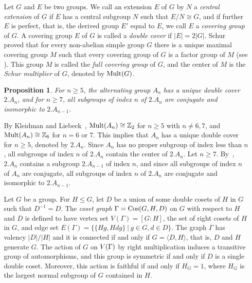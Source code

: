 \documentclass[12pt]{article}
\newtheorem{prop}[lem]{Proposition}%
\def\f{\noindent}
\def\Cos{\hbox{\rm Cos}}
\newcommand{\qed}{\mbox{\raisebox{0.7ex}{\fbox{}}} \vspace{4truemm}}
\def\mz{{\mathbb Z}}
\begin{document}
Let $G$ and $E$ be two groups. We call an extension $E$ of $G$ by $N$ a {\em central extension} of $G$ if $E$ has a central subgroup $N$ such that $E/N\cong G$, and if further $E$ is perfect, that is, the derived group $E'$ equal to $E$, we call $E$ a {\em covering group} of $G$. A covering group $E$ of $G$ is called a {\em double cover} if $|E|=2|G|$. Schur~\cite{Schur} proved that for every non-abelian simple group $G$ there is a unique maximal covering group $M$ such that every covering group of $G$ is a factor group of $M$ (see \cite[Kapitel V, \S23]{Huppert}). This group $M$ is called the {\em full covering group} of $G$, and the center of $M$ is the {\em Schur multiplier} of $G$, denoted by $\hbox{\rm Mult}(G)$.

\begin{prop}\label{prop=covering group} For $n\geq 5$, the alternating group $A_n$ has a unique double cover $2.A_n$, and for $n\geq 7$,   all subgroups of index $n$ of $2.A_n$ are conjugate and isomorphic to $2.A_{n-1}$.
\end{prop}

\f {\bf Proof:} By Kleidman and Liebeck~\cite[Theorem 5.1.4]{Kleidman}, $\Mult(A_n)\cong \mz_2$ for $n\geq 5$ with $n\not=6,7$,  and $\Mult(A_n)\cong \mz_6$ for $n=6$ or $7$. This implies that $A_n$ has a unique double cover for $n\geq 5$, denoted by $2.A_n$. Since $A_n$ has no proper subgroup of index less than $n$, all subgroups of index $n$ of $2.A_n$ contain the center of $2.A_n$. Let $n\geq 7$. By~\cite[2.7.2]{Wilson}, $2.A_n$ contains a subgroup $2.A_{n-1}$ of index $n$, and since all subgroups of index $n$ of $A_n$ are conjugate, all subgroups of index $n$ of $2.A_n$ are conjugate and isomorphic to $2.A_{n-1}$.
\hfill\qed

Let $G$ be a group. For $H\leq G$, let $D$ be a union of some double cosets of $H$ in $G$ such that $D^{-1}=D$. The \emph{coset graph} $ \Gamma=\Cos(G,H,D)$ on $G$ with respect to $H$ and $D$ is defined to have vertex set $V(\Gamma)=[G:H]$, the set of right cosets of $H$ in $G$, and edge set $E(\Gamma)=\{\{Hg,Hdg\}\ |\ g\in G,d\in D\}$. The graph $\Gamma$ has valency $|D|/|H|$ and it is connected if and only if $G=\langle D,H\rangle$, that is, $D$ and $H$ generate $G$. The action of $G$ on $V(\Gamma)$ by right multiplication induces a transitive group of automorphisms, and this group is symmetric if and only if $D$ is a single double coset. Moreover, this action is faithful if and only if $H_G=1$, where $H_G$ is the largest normal subgroup of $G$ contained in $H$.
\end{document}
